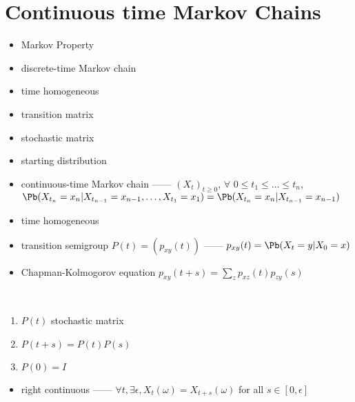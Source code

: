 \section{Continuous time Markov Chains}\label{sec:continous-time-markov-chains}

\begin{itemize}
    \item Markov Property
    \item discrete-time Markov chain
    \item time homogeneous
    \item transition matrix
    \item stochastic matrix
    \item starting distribution
    \item continuous-time Markov chain ------ $(X_t)_{t \geq 0}$, $\forall$ $0 \leq t_1 \leq \dots \leq t_n$,\\
    $\Pb(X_{t_n} = x_n|X_{t_{n-1}} = x_{n-1}, \dots, X_{t_1} = x_1) = \Pb(X_{t_n} = x_n|X_{t_{n-1}} = x_{n-1})$
    \item time homogeneous
    \item transition semigroup $P(t) = (p_{xy}(t))$ ------ $p_{xy}(t) = \Pb(X_t = y | X_0 = x)$
    \item Chapman-Kolmogorov equation $p_{xy}(t + s) = \sum_z p_{xz}(t)p_{zy}(s)$
\end{itemize}

\begin{fact}\,
    \begin{enumerate}
        \item $P(t)$ stochastic matrix
        \item $P(t + s) = P(t)P(s)$
        \item $P(0) = I$
    \end{enumerate}
\end{fact}

\begin{itemize}
    \item right continuous ------ $\forall t, \exists \epsilon, X_t(\omega) = X_{t+s}(\omega)$ for all $s \in [0, \epsilon]$
\end{itemize}

